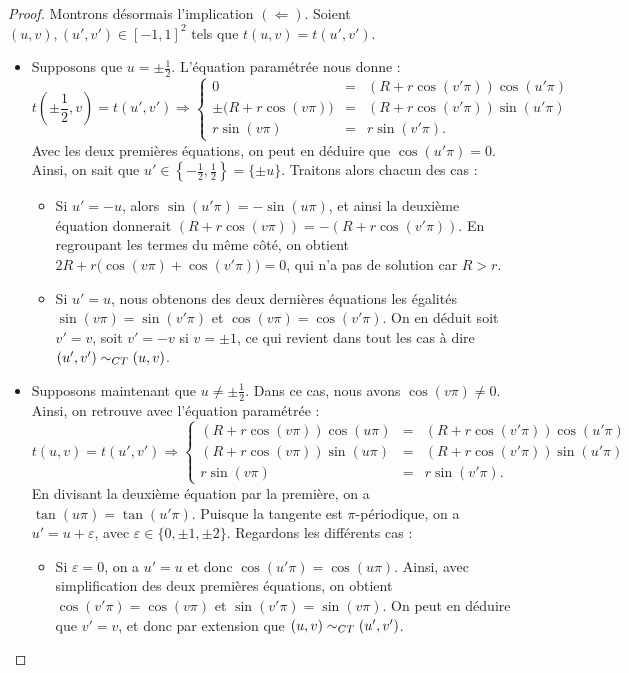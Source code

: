 \documentclass[hidelinks, 10pt]{article}
\begin{document}
\begin{proof}
\bigskip Montrons désormais l'implication $(\Leftarrow)$. Soient $(u,v),(u',v')\in[-1,1]^2$ tels que $t(u,v)=t(u',v')$.\begin{itemize}
\item Supposons que $u=\pm\frac{1}{2}$. L'équation paramétrée nous donne : \[t\left(\pm\frac{1}{2},v\right)=t(u',v')\Rightarrow\left\{\begin{matrix}
0&=&(R+r\cos(v'\pi))\cos(u'\pi)\\ 
\pm\big(R+r\cos(v\pi)\big)&=&(R+r\cos(v'\pi))\sin(u'\pi)\\ 
r\sin(v\pi)&=&r\sin(v'\pi).
\end{matrix}\right.\]Avec les deux premières équations, on peut en déduire que $\cos(u'\pi)=0$. Ainsi, on sait que $u'\in\left\{-\frac{1}{2},\frac{1}{2}\right\}=\{\pm u\}$. Traitons alors chacun des cas : \begin{itemize}
    \item Si $u'=-u$, alors $\sin(u'\pi)=-\sin(u\pi)$, et ainsi la deuxième équation donnerait $(R+r\cos(v\pi))=-(R+r\cos(v'\pi))$. En regroupant les termes du même côté, on obtient $2R+r\big(\cos(v\pi)+\cos(v'\pi)\big)=0$, qui n'a pas de solution car $R>r$.
    \item Si $u'=u$, nous obtenons des deux dernières équations les égalités~$\sin(v\pi)=\sin(v'\pi)$ et $\cos(v\pi)=\cos(v'\pi)$. On en déduit soit $v'=v$, soit $v'=-v$ si $v=\pm1$, ce qui revient dans tout les cas à dire $(u',v')\sim_{CT}(u,v)$.
\end{itemize}
\item Supposons maintenant que $u\neq\pm\frac{1}{2}$. Dans ce cas, nous avons $\cos(v\pi)\neq0$. Ainsi, on retrouve avec l'équation paramétrée :\[t(u,v)=t(u',v')\Rightarrow\left\{\begin{matrix}
(R+r\cos(v\pi))\cos(u\pi)&=&(R+r\cos(v'\pi))\cos(u'\pi)\\ 
(R+r\cos(v\pi))\sin(u\pi)&=&(R+r\cos(v'\pi))\sin(u'\pi)\\ 
r\sin(v\pi)&=&r\sin(v'\pi).
\end{matrix}\right.\]En divisant la deuxième équation par la première, on a $\tan(u\pi)=\tan(u'\pi)$. Puisque la tangente est $\pi$-périodique, on a $u'=u+\varepsilon$, avec $\varepsilon\in\{0,\pm1,\pm2\}$. Regardons les différents cas :\begin{itemize}
    \item Si $\varepsilon=0$, on a $u'=u$ et donc $\cos(u'\pi)=\cos(u\pi)$. Ainsi, avec simplification des deux premières équations, on obtient $\cos(v'\pi)=\cos(v\pi)$ et $\sin(v'\pi)=\sin(v\pi)$. On peut en déduire que $v'=v$, et donc par extension que $(u,v)\sim_{CT}(u',v')$.

\end{itemize}
\end{itemize}
\end{proof}
\end{document}
